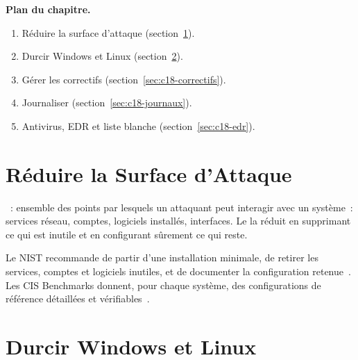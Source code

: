 \medskip
\textbf{Plan du chapitre.}
\begin{enumerate}
    \item Réduire la surface d'attaque (section~\ref{sec:c18-surface}).
    \item Durcir Windows et Linux (section~\ref{sec:c18-durcir}).
    \item Gérer les correctifs (section~\ref{sec:c18-correctifs}).
    \item Journaliser (section~\ref{sec:c18-journaux}).
    \item Antivirus, EDR et liste blanche (section~\ref{sec:c18-edr}).
\end{enumerate}

\separateur

\section{Réduire la Surface d'Attaque}
\label{sec:c18-surface}

\begin{boxdef}
~: ensemble des points par lesquels un
attaquant peut interagir avec un système~: services réseau, comptes,
logiciels installés, interfaces. Le  la réduit en
supprimant ce qui est inutile et en configurant sûrement ce qui reste.
\end{boxdef}

Le NIST recommande de partir d'une installation minimale, de retirer les
services, comptes et logiciels inutiles, et de documenter la
configuration retenue~\cite{nist800123}. Les CIS Benchmarks donnent, pour
chaque système, des configurations de référence détaillées et
vérifiables~\cite{cis2021controls}.

\section{Durcir Windows et Linux}
\label{sec:c18-durcir}

